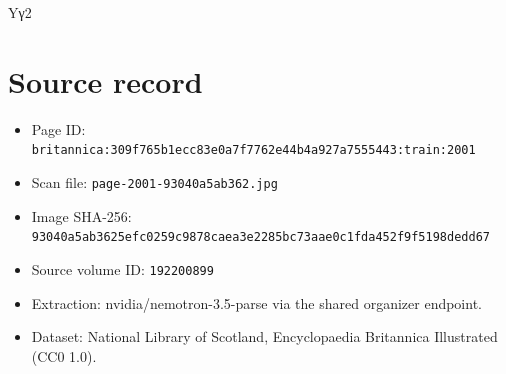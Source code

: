 \documentclass{article}
\begin{document}
Yγ2

\section*{Source record}
\begin{itemize}
\item Page ID: \texttt{britannica:309f765b1ecc83e0a7f7762e44b4a927a7555443:train:2001}
\item Scan file: \texttt{page-2001-93040a5ab362.jpg}
\item Image SHA-256: \texttt{93040a5ab3625efc0259c9878caea3e2285bc73aae0c1fda452f9f5198dedd67}
\item Source volume ID: \texttt{192200899}
\item Extraction: nvidia/nemotron-3.5-parse via the shared organizer endpoint.
\item Dataset: National Library of Scotland, Encyclopaedia Britannica Illustrated (CC0 1.0).
\end{itemize}
\end{document}

